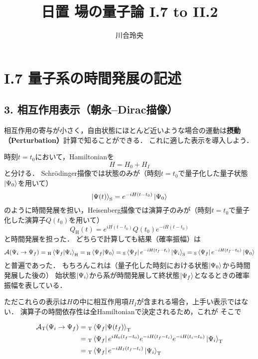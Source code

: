 \documentclass[uplatex]{jsarticle}
\numberwithin{theorem}{section}
\begin{document}
\title{日置 場の量子論 I.7 to II.2}
\author{川合玲央}

\maketitle

\section*{I.7 量子系の時間発展の記述}

\subsection*{3. 相互作用表示（朝永--Dirac描像）}
相互作用の寄与が小さく，自由状態にほとんど近いような場合の運動は\textbf{摂動（Perturbation）}計算で知ることができる．
これに適した表示を導入しよう．

時刻$t = t_0$において，Hamiltonianを
\begin{equation}
    H = H_0 + H_I
\end{equation}
と分ける．
Schr\"{o}dinger描像では状態のみが（時刻$t = t_0$で量子化した量子状態$\ket{\Psi_0}$を用いて）
\begin{equation}
    \ket{\Psi(t)}_\text{S} = e^{-i H (t - t_0)} \ket{\Psi_0}
\end{equation}
のように時間発展を担い，Heisenberg描像では演算子のみが（時刻$t = t_0$で量子化した演算子$Q(t_0)$を用いて）
\begin{equation}
    Q_\text{H}(t) = e^{i H (t - t_0)} Q(t_0) e^{-i H (t - t_0)}
\end{equation}
と時間発展を担った．
どちらで計算しても結果（確率振幅）は
\begin{equation}
    \mathcal{A}(\Psi_i \to \Psi_f)
    = {}_\text{H}\bra{\Psi_f} \ket{\Psi_i}_\text{H}
    = {}_\text{H}\bra{\Psi_f} \ket{\Psi_0}
    = {}_\text{S}\bra{\Psi_f} e^{-i H (t_f - t_i)} \ket{\Psi_i}_\text{S}
    = {}_\text{S}\bra{\Psi_f} e^{-i H (t_f - t_0)} \ket{\Psi_0}
\end{equation}
と普遍であった．
もちろんこれは（量子化した時刻における状態$\ket{\Psi_0}$から時間発展した後の）
始状態$\ket{\Psi_i}$から系が時間発展して終状態$\ket{\Psi_f}$となるときの確率振幅を表している．

ただこれらの表示は$H$の中に相互作用項$H_I$が含まれる場合，上手い表示ではない．
演算子の時間依存性は全Hamiltonianで決定されるため，これが
そこで


\begin{equation}
    \begin{split}
        \mathcal{A}_\text{T} (\Psi_i \to \Psi_f)
        &= {}_\text{T}\bra{\Psi_f}\ket{\Psi(t_f)}_\text{T} \\
        &= {}_\text{T}\bra{\Psi_f} e^{i H_0 (t_f - t_0)} e^{-i H (t_f - t_i)} e^{-i H (t_i - t_0)} \ket{\Psi_i}_\text{T} \\
        &= {}_\text{T}\bra{\Psi_f} e^{-i H_I (t_f - t_i)} \ket{\Psi_i}_\text{T}
    \end{split}
\end{equation}
\end{document}
